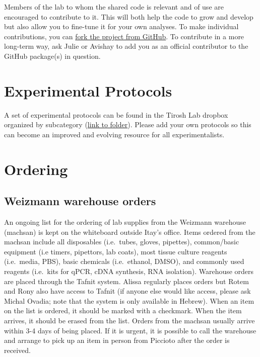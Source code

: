 \documentclass[
]{book}
\begin{document}
Members of the lab to whom the shared code is relevant and of use are encouraged to contribute to it. This will both help the code to grow and develop but also allow you to fine-tune it for your own analyses. To make individual contributions, you can \href{https://help.github.com/en/github/getting-started-with-github/fork-a-repo}{fork the project from GitHub}. To contribute in a more long-term way, ask Julie or Avishay to add you as an official contributor to the GitHub package(s) in question.

\hypertarget{protocols}{%
\chapter{Experimental Protocols}\label{protocols}}

A set of experimental protocols can be found in the Tirosh Lab dropbox organized by subcategory (\href{https://www.dropbox.com/sh/javjoi26i5k5f6t/AADAX4RgSZUFuBwtS6TRE3wua?dl=0}{link to folder}). Please add your own protocols so this can become an improved and evolving resource for all experimentalists.

\hypertarget{ordering}{%
\chapter{Ordering}\label{ordering}}

\hypertarget{weizmann-warehouse-orders}{%
\section{Weizmann warehouse orders}\label{weizmann-warehouse-orders}}

An ongoing list for the ordering of lab supplies from the Weizmann warehouse (machsan) is kept on the whiteboard outside Itay's office. Items ordered from the machsan include all disposables (i.e.~tubes, gloves, pipettes), common/basic equipment (i.e timers, pipettors, lab coats), most tissue culture reagents (i.e.~media, PBS), basic chemicals (i.e.~ethanol, DMSO), and commonly used reagents (i.e.~kits for qPCR, cDNA synthesis, RNA isolation). Warehouse orders are placed through the Tafnit system. Alissa regularly places orders but Rotem and Rony also have access to Tafnit (if anyone else would like access, please ask Michal Ovadia; note that the system is only available in Hebrew). When an item on the list is ordered, it should be marked with a checkmark. When the item arrives, it should be erased from the list. Orders from the machsan usually arrive within 3-4 days of being placed. If it is urgent, it is possible to call the warehouse and arrange to pick up an item in person from Piccioto after the order is received.
\end{document}
